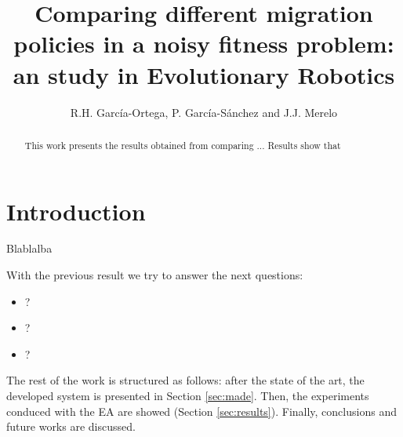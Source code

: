 \documentclass[runningheads]{llncs}
\begin{document}
\mainmatter  %



\title{Comparing different migration policies in a noisy fitness problem: an study in Evolutionary Robotics}

\author{R.H. Garc\'ia-Ortega, P. Garc\'ia-S\'anchez and J.J. Merelo}

%







\maketitle


\begin{abstract}

This work presents the results obtained from comparing ... Results show that 

\end{abstract}





\section{Introduction}
\noindent 

Blablalba




With the previous result we try to answer the next questions:
\begin{itemize}
\item ?
\item ?
\item ?
\end{itemize}

The rest of the work is structured as follows: after the state of the art, the developed system is presented in Section \ref{sec:made}. Then, the experiments conduced with the EA are showed (Section \ref{sec:results}). Finally, conclusions and future works are discussed.
\end{document}
